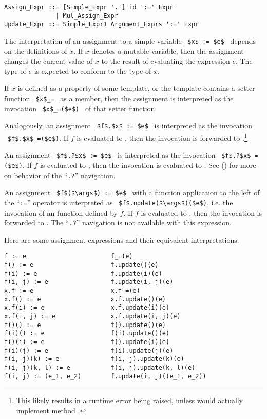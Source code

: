 \syntax\begin{lstlisting}
Assign_Expr ::= [Simple_Expr '.'] id ':=' Expr
              | Mul_Assign_Expr
Update_Expr ::= Simple_Expr1 Argument_Exprs ':=' Expr
\end{lstlisting}

The interpretation of an assignment to a simple variable ~\lstinline!$x$ := $e$!~ depends on the definitions of $x$. If $x$ denotes a mutable variable, then the assignment changes the current value of $x$ to the result of evaluating the expression $e$. The type of $e$ is expected to conform to the type of $x$. 

If $x$ is defined as a property of some template, or the template contains a setter function ~\lstinline!$x$_=!~ as a member, then the assignment is interpreted as the invocation ~\lstinline!$x$_=($e$)!~ of that setter function. 

Analogously, an assignment ~\lstinline!$f$.$x$ := $e$!~ is interpreted as the invocation ~\lstinline!$f$.$x$_=($e$)!. If $f$ is evaluated to , then the invocation is forwarded to .\footnote{This likely results in a runtime error being raised, unless  would actually implement method .} 

An assignment ~\lstinline!$f$.?$x$ := $e$!~ is interpreted as the invocation ~\lstinline!$f$.?$x$_=($e$)!. If $f$ is evaluated to , then the invocation is evaluated to . See () for more on behavior of the ``\lstinline!.?!'' navigation. 

An assignment ~\lstinline!$f$($\args$) := $e$!~ with a function application to the left of the ``\lstinline!:=!'' operator is interpreted as ~\lstinline!$f$.update($\args$)($e$)!, i.e. the invocation of an  function defined by $f$. If $f$ is evaluated to , then the invocation is forwarded to . The ``\lstinline!.?!'' navigation is not available with this expression. 

\example Here are some assignment expressions and their equivalent interpretations. 
\begin{lstlisting}
f := e                       f_=(e)
f() := e                     f.update()(e)
f(i) := e                    f.update(i)(e)
f(i, j) := e                 f.update(i, j)(e)
x.f := e                     x.f_=(e)
x.f() := e                   x.f.update()(e)
x.f(i) := e                  x.f.update(i)(e)
x.f(i, j) := e               x.f.update(i, j)(e)
f()() := e                   f().update()(e)
f(i)() := e                  f(i).update()(e)
f()(i) := e                  f().update(i)(e)
f(i)(j) := e                 f(i).update(j)(e)
f(i, j)(k) := e              f(i, j).update(k)(e)
f(i, j)(k, l) := e           f(i, j).update(k, l)(e)
f(i, j) := (e_1, e_2)        f.update(i, j)((e_1, e_2))
\end{lstlisting}






